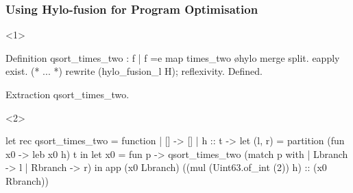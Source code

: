 \begin{frame}[fragile]
  \frametitle{Using Hylo-fusion for Program Optimisation}

  \begin{onlyenv}<1>
    \begin{minipage}{.86\columnwidth}
    \begin{bluebox}
    \begin{coqcode}
Definition qsort_times_two
  : {f | f =e map times_two \o hylo merge split}.
  eapply exist.
  (* ... *)
  rewrite (hylo_fusion_l H); reflexivity.
Defined.

Extraction qsort_times_two.
    \end{coqcode}
    \end{bluebox}
    \end{minipage}
  \end{onlyenv}

  \begin{onlyenv}<2>
    \begin{minipage}{.92\columnwidth}
    \begin{greenbox}
    \begin{ocamlcode}
let rec qsort_times_two = function
| [] -> []
| h :: t ->
  let (l, r) = partition (fun x0 -> leb x0 h) t in
  let x0 = fun p -> qsort_times_two (match p with
                                     | Lbranch -> l
                                     | Rbranch -> r) in
  app (x0 Lbranch) ((mul (Uint63.of_int (2)) h) :: (x0 Rbranch))
    \end{ocamlcode}
    \end{greenbox}
    \end{minipage}
    \end{onlyenv}
\end{frame}

